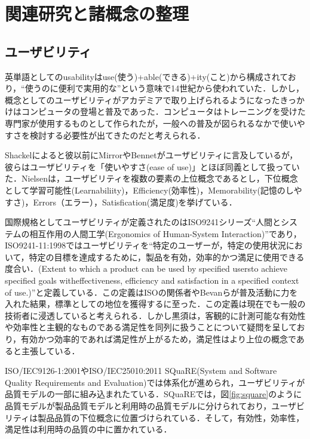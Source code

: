 \chapter{関連研究と諸概念の整理}
\label{chap:prevresearch}

\section{ユーザビリティ}

英単語としてのusabilityはuse(使う)+able(できる)+ity(こと)から構成されており，``使うのに便利で実用的な''という意味で14世紀から使われていた\cite{oed:usability}\cite{kurosu}．しかし，概念としてのユーザビリティがアカデミアで取り上げられるようになったきっかけはコンピュータの登場と普及であった\cite{kurosu}．コンピュータはトレーニングを受けた専門家が使用するものとして作られたが，一般への普及が図られるなかで使いやすさを検討する必要性が出てきたのだと考えられる．

Shackelによると彼以前にMirrorやBennetがユーザビリティに言及しているが，彼らはユーザビリティを「使いやすさ(ease of use)」とほぼ同義として扱っていた\cite{shackel1991human}\cite{kurosu}．Nielsenは，ユーザビリティを複数の要素の上位概念であるとし，下位概念として学習可能性(Learnabiliity)，Efficiency(効率性)，Memorability(記憶のしやすさ)，Errors（エラー），Satisfication(満足度)を挙げている\cite{nielsen1994}． 

国際規格としてユーザビリティが定義されたのはISO9241シリーズ``人間とシステムの相互作用の人間工学(Ergonomics of Human-System Interaction)''であり，ISO9241-11:1998ではユーザビリティを``特定のユーザーが，特定の使用状況において，特定の目標を達成するために，製品を有効，効率的かつ満足に使用できる度合い．(Extent to which a product can be used by specified usersto achieve specified goals witheffectiveness, efficiency and satisfaction in a specified context of use.)''\cite{iso9241}と定義している．この定義はISOの関係者やBevanらが普及活動に力を入れた結果，標準としての地位を獲得するに至った\cite{kurosu}．この定義は現在でも一般の技術者に浸透していると考えられる．しかし黒須は，客観的に計測可能な有効性や効率性と主観的なものである満足性を同列に扱うことについて疑問を呈しており，有効かつ効率的であれば満足性が上がるため，満足性はより上位の概念であると主張している\cite{kurosu}．

ISO/IEC9126-1:2001やISO/IEC25010:2011 SQuaRE(System and Software Quality Requirements and Evaluation)\cite{iso25010}では体系化が進められ，ユーザビリティが品質モデルの一部に組み込まれたている．SQuaREでは，図\ref{fig:square}のように品質モデルが製品品質モデルと利用時の品質モデルに分けられており，ユーザビリティは製品品質の下位概念に位置づけられている．そして，有効性，効率性，満足性は利用時の品質の中に置かれている．

